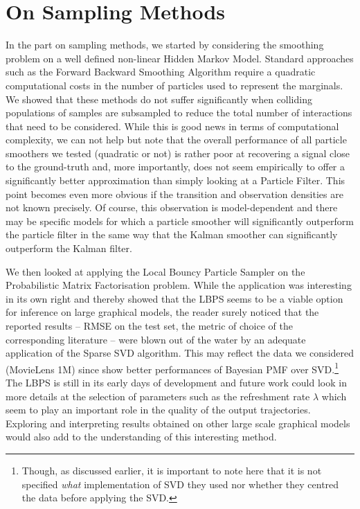 \section{On Sampling Methods}

In the part on sampling methods, we started by considering the smoothing problem on a well defined non-linear Hidden Markov Model. Standard approaches such as the Forward Backward Smoothing Algorithm require a quadratic computational costs in the number of particles used to represent the marginals. We showed that these methods do not suffer significantly when colliding populations of samples are subsampled to reduce the total number of interactions that need to be considered. 
While this is good news in terms of computational complexity, we can not help but note that the overall performance of all particle smoothers we tested (quadratic or not) is rather poor at recovering a signal close to the ground-truth and, more importantly, does not seem empirically to offer a significantly better approximation than simply looking at a Particle Filter. 
This point becomes even more obvious if the transition and observation densities are not known precisely. Of course, this observation is model-dependent and there may be specific models for which a particle smoother will significantly outperform the particle filter in the same way that the Kalman smoother can significantly outperform the Kalman filter.

We then looked at applying the Local Bouncy Particle Sampler on the Probabilistic Matrix Factorisation problem. While the application was interesting in its own right and thereby showed that the LBPS seems to be a viable option for inference on large graphical models, the reader surely noticed that the reported results -- RMSE on the test set, the metric of choice of the corresponding literature -- were blown out of the water by an adequate application of the Sparse SVD algorithm. This may reflect the data we considered (MovieLens 1M) since \cite{mnih08} show better performances of Bayesian PMF over SVD.\footnote{Though, as discussed earlier, it is important to note here that it is not specified \emph{what} implementation of SVD they used nor whether they centred the data before applying the SVD. } The LBPS is still in its early days of development and future work could look in more details at the selection of parameters such as the refreshment rate $\lambda$ which seem to play an important role in the quality of the output trajectories. Exploring and interpreting results obtained on other large scale graphical models would also add to the understanding of this interesting method.

